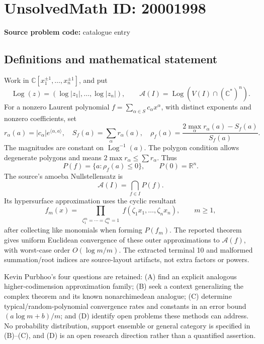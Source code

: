 \documentclass[11pt]{article}
\newcommand{\R}{\mathbb{R}}
\newcommand{\C}{\mathbb{C}}
\begin{document}
\section*{UnsolvedMath ID: 20001998}
\textbf{Source problem code:} catalogue entry
\subsection{Definitions and mathematical statement}
Work in \(\C[x_1^{\pm1},\ldots,x_n^{\pm1}]\), and put
\[
 \operatorname{Log}(z)=(\log|z_1|,\ldots,\log|z_n|),\qquad
 \mathcal A(I)=\operatorname{Log}(V(I)\cap(\C^*)^n).
\]
For a nonzero Laurent polynomial \(f=\sum_{\alpha\in S}c_\alpha x^\alpha\), with distinct exponents and nonzero coefficients, set
\[
 r_\alpha(a)=|c_\alpha|e^{\langle\alpha,a\rangle},\quad
 S_f(a)=\sum_\alpha r_\alpha(a),\quad
 \rho_f(a)=\frac{2\max_\alpha r_\alpha(a)-S_f(a)}{S_f(a)}.
\]
The magnitudes are constant on \(\operatorname{Log}^{-1}(a)\). The polygon condition allows degenerate polygons and means \(2\max r_\alpha\leq\sum r_\alpha\). Thus
\[
 P(f)=\{a:\rho_f(a)\leq0\},\qquad P(0)=\R^n.
\]
The source's amoeba Nullstellensatz is
\[
 \mathcal A(I)=\bigcap_{f\in I}P(f).
\]
Its hypersurface approximation uses the cyclic resultant
\[
 f_m(x)=\prod_{\substack{\zeta_1^m=\cdots=\zeta_n^m=1}}
                   f(\zeta_1x_1,\ldots,\zeta_nx_n),
 \qquad m\geq1,
\]
after collecting like monomials when forming \(P(f_m)\). The reported theorem gives uniform Euclidean convergence of these outer approximations to \(\mathcal A(f)\), with worst-case order \(O(\log m/m)\). The extracted terminal 10 and malformed summation/root indices are source-layout artifacts, not extra factors or powers.

Kevin Purbhoo's four questions are retained: (A) find an explicit analogous higher-codimension approximation family; (B) seek a context generalizing the complex theorem and its known nonarchimedean analogue; (C) determine typical/random-polynomial convergence rates and constants in an error bound \((a\log m+b)/m\); and (D) identify open problems these methods can address. No probability distribution, support ensemble or general category is specified in (B)--(C), and (D) is an open research direction rather than a quantified assertion.
\end{document}

